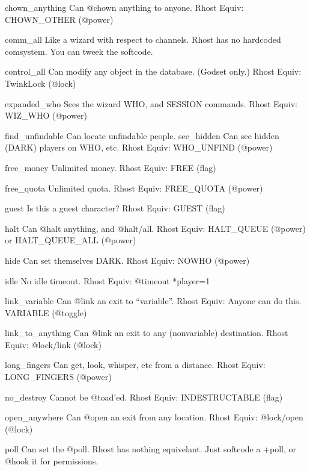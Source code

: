 \documentclass[letterpaper,10pt,english]{sphinxmanual}
\begin{document}
\sphinxAtStartPar
chown\_anything        Can @chown anything to anyone.
Rhost Equiv: CHOWN\_OTHER (@power)

\sphinxAtStartPar
comm\_all              Like a wizard with respect to channels.
Rhost has no hardcoded comsystem.  You can tweek the softcode.

\sphinxAtStartPar
control\_all           Can modify any object in the database. (God\sphinxhyphen{}set only.)
Rhost Equiv: TwinkLock (@lock)

\sphinxAtStartPar
expanded\_who          Sees the wizard WHO, and SESSION commands.
Rhost Equiv: WIZ\_WHO (@power)

\sphinxAtStartPar
find\_unfindable       Can locate unfindable people.
see\_hidden            Can see hidden (DARK) players on WHO, etc.
Rhost Equiv: WHO\_UNFIND (@power)

\sphinxAtStartPar
free\_money            Unlimited money.
Rhost Equiv: FREE (flag)

\sphinxAtStartPar
free\_quota            Unlimited quota.
Rhost Equiv: FREE\_QUOTA (@power)

\sphinxAtStartPar
guest                 Is this a guest character?
Rhost Equiv: GUEST (flag)

\sphinxAtStartPar
halt                  Can @halt anything, and @halt/all.
Rhost Equiv: HALT\_QUEUE (@power) or HALT\_QUEUE\_ALL (@power)

\sphinxAtStartPar
hide                  Can set themselves DARK.
Rhost Equiv: NOWHO (@power)

\sphinxAtStartPar
idle                  No idle timeout.
Rhost Equiv: @timeout *player=\sphinxhyphen{}1

\sphinxAtStartPar
link\_variable         Can @link an exit to “variable”.
Rhost Equiv: Anyone can do this.  VARIABLE (@toggle)

\sphinxAtStartPar
link\_to\_anything      Can @link an exit to any (non\sphinxhyphen{}variable) destination.
Rhost Equiv: @lock/link (@lock)

\sphinxAtStartPar
long\_fingers          Can get, look, whisper, etc from a distance.
Rhost Equiv: LONG\_FINGERS (@power)

\sphinxAtStartPar
no\_destroy            Cannot be @toad’ed.
Rhost Equiv: INDESTRUCTABLE (flag)

\sphinxAtStartPar
open\_anywhere         Can @open an exit from any location.
Rhost Equiv: @lock/open (@lock)

\sphinxAtStartPar
poll                  Can set the @poll.
Rhost has nothing equivelant.  Just softcode a +poll, or @hook it for permissions.
\end{document}

